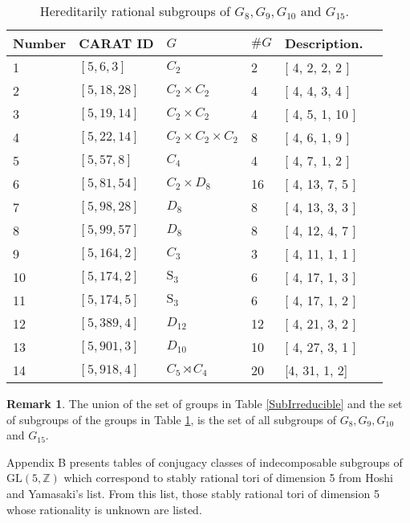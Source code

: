 \documentclass[12pt]{article}
\theoremstyle{plain}
\theoremstyle{definition}
\newtheorem*{remark}{Remark}
\newcommand{\Z}{\ensuremath{\mathbb{Z}}}
\begin{document}
\begin{table}
\begin{tabular}{llllll} 
Number & CARAT ID & $G$ & $\#G$ & Description.\\\hline
1 & $[5,6,3]$ & $C_2$ & 2  & [ 4, 2, 2, 2 ] \\
2 & $[5,18,28]$ & $C_2 \times C_2$  &  4& [ 4, 4, 3, 4 ] \\
3 & $[5,19,14]$ &  $C_2 \times C_2$  &  4  & [ 4, 5, 1, 10 ]  \\
4 & $[5,22,14]$ & $C_2 \times C_2 \times C_2$  & 8 & [ 4, 6, 1, 9 ] \\
5 & $[5,57,8]$ & $C_4$ &  4 & [ 4, 7, 1, 2 ] \\
6 & $[5,81,54]$ & $C_2 \times D_8$  & 16 & [ 4, 13, 7, 5 ]  \\
7 & $[5,98,28]$ & $D_8$ & 8 & [ 4, 13, 3, 3 ] \\
8 & $[5,99,57]$ & $D_8$ & 8  & [ 4, 12, 4, 7 ]   \\
9 & $[5,164,2]$ & $C_3$ & 3 & [ 4, 11, 1, 1 ]  \\
10 & $[5,174,2]$ & $\mathrm{S}_3$ & 6  & [ 4, 17, 1, 3 ] \\
11 & $[5,174,5]$ & $\mathrm{S}_3$ & 6 & [ 4, 17, 1, 2 ] \\
12 & $[5,389,4]$ & $D_{12}$ &  12 &  [ 4, 21, 3, 2 ] \\
13 & $[5,901,3]$ & $D_{10}$  & 10 & [ 4, 27, 3, 1 ] \\
14 & $[5,918,4]$ & $C_5 \rtimes C_4$ & 20 & [4, 31, 1, 2]
\end{tabular}
\caption{Hereditarily rational subgroups of $G_8, G_9, G_{10}$ and $G_{15}$.}
\label{IrreducibleSubs}
\end{table}
\begin{remark}
The union of the set of groups in Table \ref{SubIrreducible} and the set of subgroups of the groups in Table \ref{IrreducibleSubs}, is the set of all subgroups of $G_8, G_9, G_{10}$ and $G_{15}$.
\end{remark}
Appendix B presents tables of conjugacy classes of indecomposable subgroups of $\mathrm{GL}(5,\Z)$ which correspond to stably rational tori of dimension 5 from Hoshi and Yamasaki's list. From this list, those stably rational tori of dimension 5 whose rationality is unknown are listed.

{}
\end{document}
